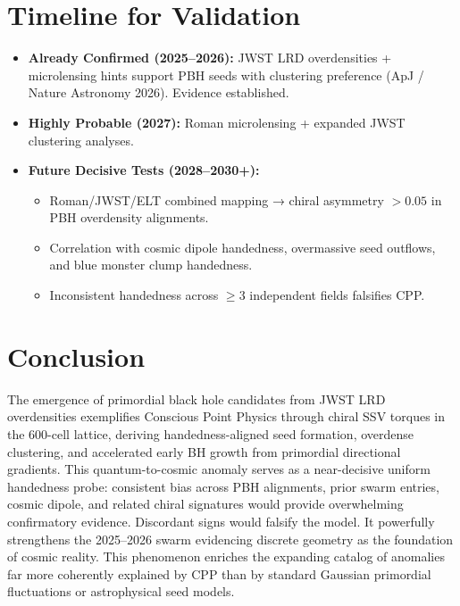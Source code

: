 \documentclass[11pt]{article}
\begin{document}
\section{Timeline for Validation}
\begin{itemize}
    \item \textbf{Already Confirmed (2025--2026):} JWST LRD overdensities + microlensing hints support PBH seeds with clustering preference (ApJ / Nature Astronomy 2026). Evidence established.
    \item \textbf{Highly Probable (2027):} Roman microlensing + expanded JWST clustering analyses.
    \item \textbf{Future Decisive Tests (2028--2030+):}
    \begin{itemize}
        \item Roman/JWST/ELT combined mapping → chiral asymmetry $>0.05$ in PBH overdensity alignments.
        \item Correlation with cosmic dipole handedness, overmassive seed outflows, and blue monster clump handedness.
        \item Inconsistent handedness across $\geq 3$ independent fields falsifies CPP.
    \end{itemize}
\end{itemize}

\section{Conclusion}
The emergence of primordial black hole candidates from JWST LRD overdensities exemplifies Conscious Point Physics through chiral SSV torques in the 600-cell lattice, deriving handedness-aligned seed formation, overdense clustering, and accelerated early BH growth from primordial directional gradients.  
This quantum-to-cosmic anomaly serves as a near-decisive uniform handedness probe: consistent bias across PBH alignments, prior swarm entries, cosmic dipole, and related chiral signatures would provide overwhelming confirmatory evidence. Discordant signs would falsify the model. It powerfully strengthens the 2025--2026 swarm evidencing discrete geometry as the foundation of cosmic reality.  
This phenomenon enriches the expanding catalog of anomalies far more coherently explained by CPP than by standard Gaussian primordial fluctuations or astrophysical seed models.
\end{document}
